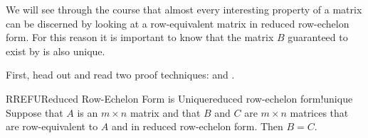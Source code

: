 %
We will see through the course that almost every interesting property of a matrix can be discerned by looking at a row-equivalent matrix in reduced row-echelon form.  For this reason it is important to know that the matrix $B$ guaranteed to exist by  is also unique.\par
%
{First, head out and read two proof techniques:   and .}
%
\begin{theorem}{RREFU}{Reduced Row-Echelon Form is Unique}{reduced row-echelon form!unique}
Suppose that $A$ is an $m\times n$ matrix and that $B$ and $C$ are $m\times n$ matrices that are row-equivalent to $A$ and in reduced row-echelon form.  Then $B=C$.
\end{theorem}
%
